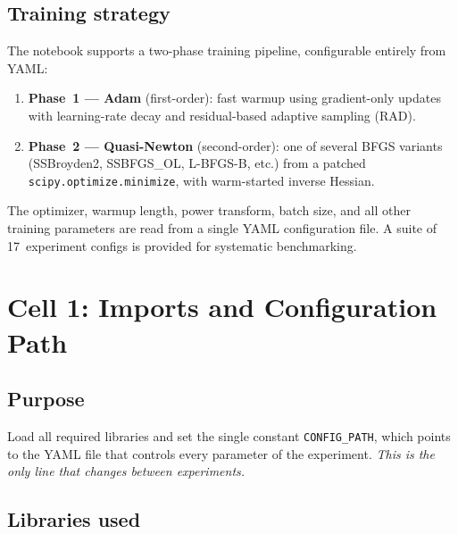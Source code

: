 \documentclass[11pt,a4paper]{article}
\begin{document}
\subsection*{Training strategy}

The notebook supports a two-phase training pipeline, configurable
entirely from YAML:

\begin{enumerate}
  \item \textbf{Phase~1 --- Adam} (first-order): fast warmup using
        gradient-only updates with learning-rate decay and residual-based
        adaptive sampling (RAD).
  \item \textbf{Phase~2 --- Quasi-Newton} (second-order): one of several
        BFGS variants (SSBroyden2, SSBFGS\_OL, L-BFGS-B, etc.) from
        a patched \texttt{scipy.optimize.minimize}, with warm-started
        inverse Hessian.
\end{enumerate}

The optimizer, warmup length, power transform, batch size, and all
other training parameters are read from a single YAML configuration
file.  A suite of 17~experiment configs is provided for systematic
benchmarking.


\section{Cell 1: Imports and Configuration Path}
\label{sec:imports}

\subsection*{Purpose}

Load all required libraries and set the single constant
\texttt{CONFIG\_PATH}, which points to the YAML file that controls
every parameter of the experiment.  \emph{This is the only line that
changes between experiments.}

\subsection*{Libraries used}
\end{document}
